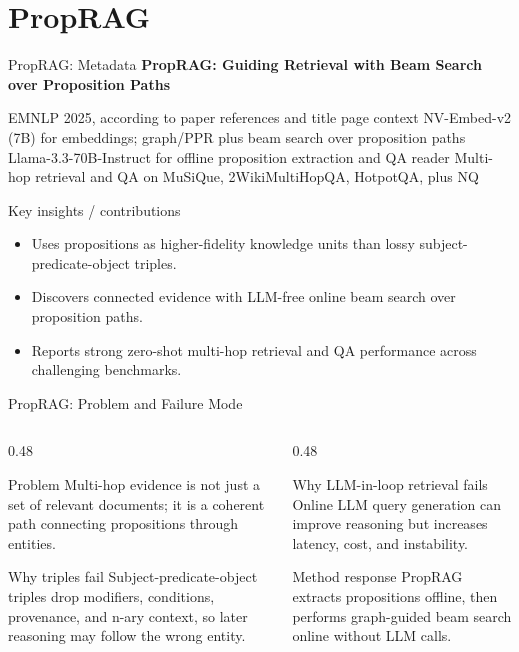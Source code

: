 \section{PropRAG}

\begin{frame}{PropRAG: Metadata}
\small
\textbf{PropRAG: Guiding Retrieval with Beam Search over Proposition Paths}

\paperinfo
{EMNLP 2025, according to paper references and title page context}
{NV-Embed-v2 (7B) for embeddings; graph/PPR plus beam search over proposition paths}
{Llama-3.3-70B-Instruct for offline proposition extraction and QA reader}
{Multi-hop retrieval and QA on MuSiQue, 2WikiMultiHopQA, HotpotQA, plus NQ}

\begin{block}{Key insights / contributions}
\scriptsize
\begin{itemize}
  \item Uses propositions as higher-fidelity knowledge units than lossy subject-predicate-object triples.
  \item Discovers connected evidence with LLM-free online beam search over proposition paths.
  \item Reports strong zero-shot multi-hop retrieval and QA performance across challenging benchmarks.
\end{itemize}
\end{block}
\end{frame}

\begin{frame}{PropRAG: Problem and Failure Mode}
\scriptsize
\begin{columns}[T,onlytextwidth]
  \begin{column}{0.48\textwidth}
    \begin{block}{Problem}
      Multi-hop evidence is not just a set of relevant documents; it is a coherent path connecting propositions through entities.
    \end{block}
    \begin{block}{Why triples fail}
      Subject-predicate-object triples drop modifiers, conditions, provenance, and n-ary context, so later reasoning may follow the wrong entity.
    \end{block}
  \end{column}
  \begin{column}{0.48\textwidth}
    \begin{block}{Why LLM-in-loop retrieval fails}
      Online LLM query generation can improve reasoning but increases latency, cost, and instability.
    \end{block}
    \begin{block}{Method response}
      PropRAG extracts propositions offline, then performs graph-guided beam search online without LLM calls.
    \end{block}
  \end{column}
\end{columns}
\end{frame}

